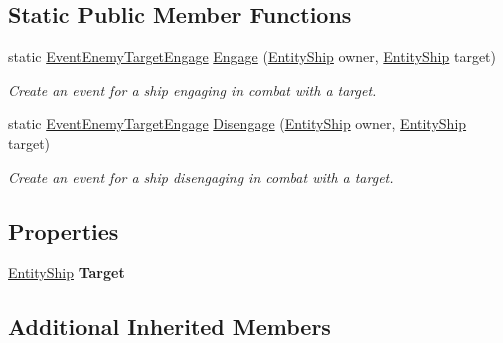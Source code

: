 \subsection*{Static Public Member Functions}
\begin{DoxyCompactItemize}
\item 
static \hyperlink{class_skyrates_1_1_game_1_1_event_1_1_event_enemy_target_engage}{Event\-Enemy\-Target\-Engage} \hyperlink{class_skyrates_1_1_game_1_1_event_1_1_event_enemy_target_engage_a07f08ed2c95ed262fe8e6b4d47e5904c}{Engage} (\hyperlink{class_skyrates_1_1_entity_1_1_entity_ship}{Entity\-Ship} owner, \hyperlink{class_skyrates_1_1_entity_1_1_entity_ship}{Entity\-Ship} target)
\begin{DoxyCompactList}\small\item\em Create an event for a ship engaging in combat with a target. \end{DoxyCompactList}\item 
static \hyperlink{class_skyrates_1_1_game_1_1_event_1_1_event_enemy_target_engage}{Event\-Enemy\-Target\-Engage} \hyperlink{class_skyrates_1_1_game_1_1_event_1_1_event_enemy_target_engage_aaced1845ab700b0afcaa355ac230b663}{Disengage} (\hyperlink{class_skyrates_1_1_entity_1_1_entity_ship}{Entity\-Ship} owner, \hyperlink{class_skyrates_1_1_entity_1_1_entity_ship}{Entity\-Ship} target)
\begin{DoxyCompactList}\small\item\em Create an event for a ship disengaging in combat with a target. \end{DoxyCompactList}\end{DoxyCompactItemize}
\subsection*{Properties}
\begin{DoxyCompactItemize}
\item 
\hypertarget{class_skyrates_1_1_game_1_1_event_1_1_event_enemy_target_engage_affa4162b753455e8ae06710bdc143f34}{\hyperlink{class_skyrates_1_1_entity_1_1_entity_ship}{Entity\-Ship} {\bfseries Target}}\label{class_skyrates_1_1_game_1_1_event_1_1_event_enemy_target_engage_affa4162b753455e8ae06710bdc143f34}

\end{DoxyCompactItemize}
\subsection*{Additional Inherited Members}


